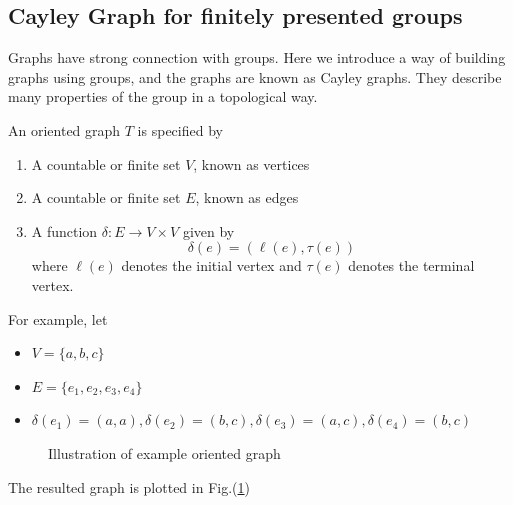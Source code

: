 \subsection{Cayley Graph for finitely presented groups}
Graphs have strong connection with groups. Here we introduce a way of building graphs using groups, and the graphs are known as Cayley graphs.
They describe many properties of the group in a topological way.
\begin{definition}
An oriented graph $T$ is specified by
\begin{enumerate}
\item
A countable or finite set $V$, known as vertices
\item
A countable or finite set $E$, known as edges
\item
A function $\delta:E\to V\times V$ given by
\[
\delta(e) = (\ell(e),\tau(e))
\]
where $\ell(e)$ denotes the initial vertex and $\tau(e)$ denotes the terminal vertex.
\end{enumerate}
\end{definition}
For example, let 
\begin{itemize}
\item
$V=\{a,b,c\}$
\item
$E=\{e_1,e_2,e_3,e_4\}$
\item
$\delta(e_1)=(a,a),
\delta(e_2)=(b,c),
\delta(e_3)=(a,c),
\delta(e_4)=(b,c)$
\end{itemize}
\begin{figure}[H]
	\caption{Illustration of example oriented graph}
	\label{Fig:11:2}
\end{figure}
The resulted graph is plotted in Fig.(\ref{Fig:11:2})


